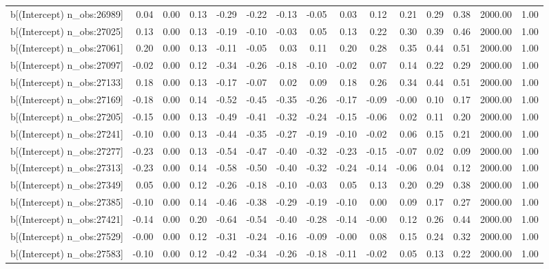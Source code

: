 \begin{table}[ht]
\begin{tabular}{rrrrrrrrrrrrrrr}
  b[(Intercept) n\_obs:26989] & 0.04 & 0.00 & 0.13 & -0.29 & -0.22 & -0.13 & -0.05 & 0.03 & 0.12 & 0.21 & 0.29 & 0.38 & 2000.00 & 1.00 \\ 
  b[(Intercept) n\_obs:27025] & 0.13 & 0.00 & 0.13 & -0.19 & -0.10 & -0.03 & 0.05 & 0.13 & 0.22 & 0.30 & 0.39 & 0.46 & 2000.00 & 1.00 \\ 
  b[(Intercept) n\_obs:27061] & 0.20 & 0.00 & 0.13 & -0.11 & -0.05 & 0.03 & 0.11 & 0.20 & 0.28 & 0.35 & 0.44 & 0.51 & 2000.00 & 1.00 \\ 
  b[(Intercept) n\_obs:27097] & -0.02 & 0.00 & 0.12 & -0.34 & -0.26 & -0.18 & -0.10 & -0.02 & 0.07 & 0.14 & 0.22 & 0.29 & 2000.00 & 1.00 \\ 
  b[(Intercept) n\_obs:27133] & 0.18 & 0.00 & 0.13 & -0.17 & -0.07 & 0.02 & 0.09 & 0.18 & 0.26 & 0.34 & 0.44 & 0.51 & 2000.00 & 1.00 \\ 
  b[(Intercept) n\_obs:27169] & -0.18 & 0.00 & 0.14 & -0.52 & -0.45 & -0.35 & -0.26 & -0.17 & -0.09 & -0.00 & 0.10 & 0.17 & 2000.00 & 1.00 \\ 
  b[(Intercept) n\_obs:27205] & -0.15 & 0.00 & 0.13 & -0.49 & -0.41 & -0.32 & -0.24 & -0.15 & -0.06 & 0.02 & 0.11 & 0.20 & 2000.00 & 1.00 \\ 
  b[(Intercept) n\_obs:27241] & -0.10 & 0.00 & 0.13 & -0.44 & -0.35 & -0.27 & -0.19 & -0.10 & -0.02 & 0.06 & 0.15 & 0.21 & 2000.00 & 1.00 \\ 
  b[(Intercept) n\_obs:27277] & -0.23 & 0.00 & 0.13 & -0.54 & -0.47 & -0.40 & -0.32 & -0.23 & -0.15 & -0.07 & 0.02 & 0.09 & 2000.00 & 1.00 \\ 
  b[(Intercept) n\_obs:27313] & -0.23 & 0.00 & 0.14 & -0.58 & -0.50 & -0.40 & -0.32 & -0.24 & -0.14 & -0.06 & 0.04 & 0.12 & 2000.00 & 1.00 \\ 
  b[(Intercept) n\_obs:27349] & 0.05 & 0.00 & 0.12 & -0.26 & -0.18 & -0.10 & -0.03 & 0.05 & 0.13 & 0.20 & 0.29 & 0.38 & 2000.00 & 1.00 \\ 
  b[(Intercept) n\_obs:27385] & -0.10 & 0.00 & 0.14 & -0.46 & -0.38 & -0.29 & -0.19 & -0.10 & 0.00 & 0.09 & 0.17 & 0.27 & 2000.00 & 1.00 \\ 
  b[(Intercept) n\_obs:27421] & -0.14 & 0.00 & 0.20 & -0.64 & -0.54 & -0.40 & -0.28 & -0.14 & -0.00 & 0.12 & 0.26 & 0.44 & 2000.00 & 1.00 \\ 
  b[(Intercept) n\_obs:27529] & -0.00 & 0.00 & 0.12 & -0.31 & -0.24 & -0.16 & -0.09 & -0.00 & 0.08 & 0.15 & 0.24 & 0.32 & 2000.00 & 1.00 \\ 
  b[(Intercept) n\_obs:27583] & -0.10 & 0.00 & 0.12 & -0.42 & -0.34 & -0.26 & -0.18 & -0.11 & -0.02 & 0.05 & 0.13 & 0.22 & 2000.00 & 1.00 \\ 

\end{tabular}
\end{table}
